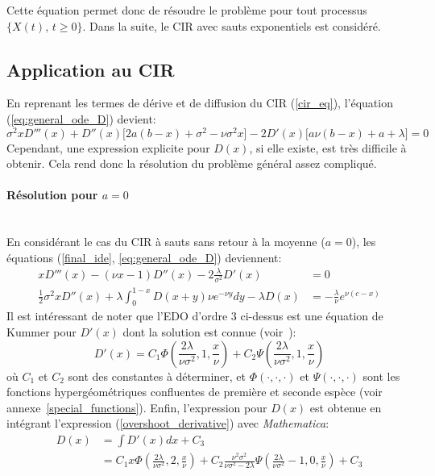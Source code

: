 Cette équation permet donc de résoudre le problème pour tout processus \(\{X(t),\,t\geq0\}\). Dans la suite, le \acs{CIR} avec sauts exponentiels est considéré.
\subsection{Application au CIR}
En reprenant les termes de dérive et de diffusion du \acs{CIR} (\ref{cir_eq}), l'équation (\ref{eq:general_ode_D}) devient:
\[
\sigma ^2 x D'''(x)+D''(x) \big[2 a (b-x)+\sigma ^2-\nu  \sigma ^2x\big]-2 D'(x) \big[a \nu  (b-x)+a+\lambda \big]=0
\]
Cependant, une expression explicite pour $D(x)$, si elle existe, est très difficile à obtenir. Cela rend donc la résolution du problème général assez compliqué. 
\paragraph{Résolution pour $a=0$}\phantom{}\\
En considérant le cas du \acs{CIR} à sauts sans retour à la moyenne ($a=0$), les équations (\ref{final_ide}, \ref{eq:general_ode_D}) deviennent:
\begin{equation}\label{overshoot_equations}
    \begin{aligned}
        xD'''(x)-(\nu x-1) D''(x)-2\frac{\lambda}{\sigma^2} D'(x)&=0 \\
        \frac{1}{2}\sigma^2xD''(x)+\lambda\int_0^{1-x}D(x+y)\nu e^{-\nu y}dy-\lambda D(x)&=-\frac{\lambda}{\nu}e^{\nu(c-x)}
    \end{aligned}
\end{equation}
Il est intéressant de noter que l'\acs{EDO} d'ordre 3 ci-dessus est une équation de Kummer pour \(D'(x)\) dont la solution est connue (voir~\cite{magnus1966}):
\begin{equation}\label{overshoot_derivative}
    D'(x)=C_1\Phi\left(\frac{2\lambda}{\nu\sigma^2},1,\frac{x}{\nu}\right)+C_2\Psi\left(\frac{2\lambda}{\nu\sigma^2},1,\frac{x}{\nu}\right)
\end{equation}
où $C_1$ et $C_2$ sont des constantes à déterminer, et $\Phi(\cdot, \cdot, \cdot)$ et $\Psi(\cdot, \cdot, \cdot)$ sont les fonctions hypergéométriques confluentes de première et seconde espèce (voir annexe~\ref{special_functions}). Enfin, l'expression pour \(D(x)\) est obtenue en intégrant l'expression (\ref{overshoot_derivative}) avec \textit{Mathematica}:
\[
\begin{aligned}
    D(x)&=\int D'(x)dx+C_3\\
    &=C_1 x \Phi\left(\frac{2 \lambda }{\nu \sigma^2},2,\frac{x}{\nu }\right)+C_2 \frac{\nu^2\sigma^2}{\nu\sigma^2-2\lambda}\Psi\left(\frac{2 \lambda }{\nu \sigma^2}-1,0,\frac{x}{\nu }\right)+C_3
\end{aligned}
\]
